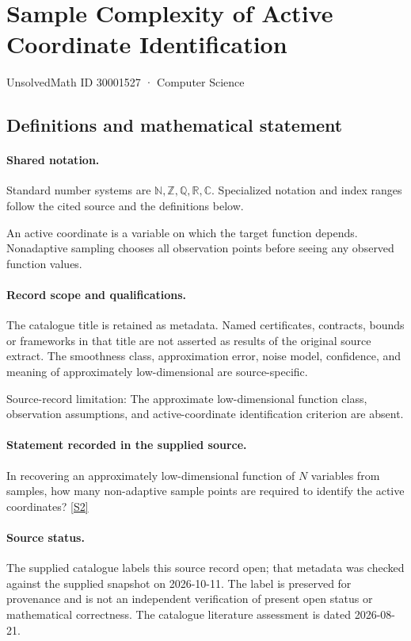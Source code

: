 \documentclass[11pt]{article}
\newcommand{\sref}[2]{\hyperlink{source:#1:#2}{[S#2]}}
\begin{document}
\setcounter{section}{30001526}
\section{Sample Complexity of Active Coordinate Identification}\label{30001527}
{\small\sffamily UnsolvedMath ID 30001527 · Computer Science}
\subsection{Definitions and mathematical statement}

\paragraph{Shared notation.}Standard number systems are $\mathbb N,\mathbb Z,\mathbb Q,\mathbb R,\mathbb C$. Specialized notation and index ranges follow the cited source and the definitions below.


An active coordinate is a variable on which the target function depends. Nonadaptive sampling chooses all observation points before seeing any observed function values.
\paragraph{Record scope and qualifications.}
The catalogue title is retained as metadata. Named certificates, contracts, bounds or frameworks in that title are not asserted as results of the original source extract.
The smoothness class, approximation error, noise model, confidence, and meaning of approximately low-dimensional are source-specific.

Source-record limitation: The approximate low-dimensional function class, observation assumptions, and active-coordinate identification criterion are absent.
\paragraph{Statement recorded in the supplied source.}
In recovering an approximately low-dimensional function of $N$ variables from samples, how many non-adaptive sample points are required to identify the active coordinates? \sref{30001527}{2}
\paragraph{Source status.}
The supplied catalogue labels this source record open; that metadata was checked against the supplied snapshot on 2026-10-11. The label is preserved for provenance and is not an independent verification of present open status or mathematical correctness. The catalogue literature assessment is dated 2026-08-21.
\end{document}
